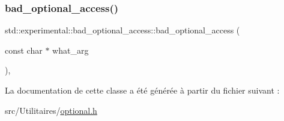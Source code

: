 \mbox{\label{classstd_1_1experimental_1_1bad__optional__access_a75d7625c06d41839667c6cc9ce144bd1}} 
\subsubsection{\texorpdfstring{bad\+\_\+optional\+\_\+access()}{bad\_optional\_access()}\hspace{0.1cm}{\footnotesize\ttfamily [2/2]}}
{\footnotesize\ttfamily std\+::experimental\+::bad\+\_\+optional\+\_\+access\+::bad\+\_\+optional\+\_\+access (\begin{DoxyParamCaption}\item[{const char $\ast$}]{what\+\_\+arg }\end{DoxyParamCaption})\hspace{0.3cm}{\ttfamily [inline]}, {\ttfamily [explicit]}}



La documentation de cette classe a été générée à partir du fichier suivant \+:\begin{DoxyCompactItemize}
\item 
src/\+Utilitaires/\hyperlink{optional_8h}{optional.\+h}\end{DoxyCompactItemize}
